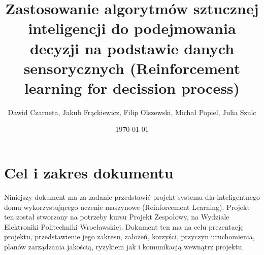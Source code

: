 \documentclass{article}
\title{Zastosowanie algorytmów sztucznej inteligencji do podejmowania
decyzji na podstawie danych sensorycznych (Reinforcement learning for decission process)} %
\author{Dawid Czarneta, Jakub Frąckiewicz, Filip Olszewski, Michał Popiel, Julia Szulc}
\date{\today}
\begin{document}
\maketitle

\section{Cel i zakres dokumentu}
Niniejszy dokument ma za zadanie przedstawić projekt systemu dla inteligentnego domu wykorzystującego uczenie maszynowe (Reinforcement Learning). Projekt ten został stworzony na potrzeby kursu Projekt Zespołowy, na Wydziale Elektroniki Politechniki Wrocławskiej. Dokument ten ma na celu prezentację projektu, przedstawienie jego zakresu, założeń, korzyści, przyczyn uruchomienia, planów zarządzania jakością, ryzykiem jak i komunikacją wewnątrz projektu.
\end{document}
